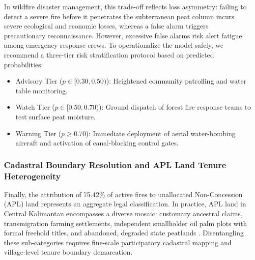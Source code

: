 In wildfire disaster management, this trade-off reflects loss asymmetry: failing to detect a severe fire before it penetrates the subterranean peat column incurs severe ecological and economic losses, whereas a false alarm triggers precautionary reconnaissance. However, excessive false alarms risk alert fatigue among emergency response crews. To operationalize the model safely, we recommend a three-tier risk stratification protocol based on predicted probabilities:
\begin{itemize}
    \item Advisory Tier ($p \in [0.30, 0.50)$): Heightened community patrolling and water table monitoring.
    \item Watch Tier ($p \in [0.50, 0.70)$): Ground dispatch of forest fire response teams to test surface peat moisture.
    \item Warning Tier ($p \ge 0.70$): Immediate deployment of aerial water-bombing aircraft and activation of canal-blocking control gates.
\end{itemize}

\subsubsection{Cadastral Boundary Resolution and APL Land Tenure Heterogeneity}
Finally, the attribution of 75.42\% of active fires to unallocated Non-Concession (APL) land represents an aggregate legal classification. In practice, APL land in Central Kalimantan encompasses a diverse mosaic: customary ancestral claims, transmigration farming settlements, independent smallholder oil palm plots with formal freehold titles, and abandoned, degraded state peatlands \citep{Putranto2023LandUsePol}. Disentangling these sub-categories requires fine-scale participatory cadastral mapping and village-level tenure boundary demarcation.
